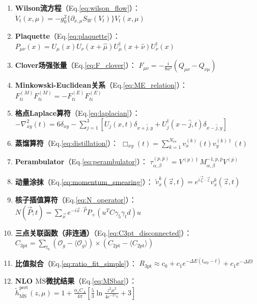 \documentclass[12pt,a4paper]{ctexart}
\theoremstyle{definition}
\newcommand{\MS}{\overline{\text{MS}}}
\newcommand{\hpert}{\tilde{h}^{\text{pert}}}
\newcommand{\tsep}{t_{\text{sep}}}
\newcommand{\alphas}{\alpha_s}
\newcommand{\CA}{C_A}
\begin{document}
\begin{enumerate}[label=(A\arabic*), leftmargin=*]
    \item \textbf{Wilson流方程}（Eq.\ref{eq:wilson_flow}）：
    $\dot{V}_t(x,\mu) = -g_0^2 \{\partial_{x,\mu} S_W(V_t)\} V_t(x,\mu)$

    \item \textbf{Plaquette}（Eq.\ref{eq:plaquette}）：
    $P_{\mu\nu}(x) = U_\mu(x) U_\nu(x+\hat{\mu}) U^\dagger_\mu(x+\hat{\nu}) U^\dagger_\nu(x)$

    \item \textbf{Clover场强张量}（Eq.\ref{eq:F_clover}）：
    $F_{\mu\nu} = -\frac{i}{8a^2} (Q_{\mu\nu} - Q_{\nu\mu})$

    \item \textbf{Minkowski-Euclidean关系}（Eq.\ref{eq:ME_relation}）：
    $F^{(M)}_{ti} F^{(M)}_{ti} = -F^{(E)}_{ti} F^{(E)}_{ti}$

    \item \textbf{格点Laplace算符}（Eq.\ref{eq:laplacian}）：
    $-\nabla^2_{xy}(t) = 6\delta_{xy} - \sum_{j=1}^{3} [U_j(x,t)\delta_{x+\hat{j},y} + U^\dagger_j(x-\hat{j},t)\delta_{x-\hat{j},y}]$

    \item \textbf{蒸馏算符}（Eq.\ref{eq:distillation}）：
    $\Box_{xy}(t) = \sum_{k=1}^{N_{\text{ev}}} v^{(k)}_x(t) v^{(k)\dagger}_y(t)$

    \item \textbf{Perambulator}（Eq.\ref{eq:perambulator}）：
    $\tau^{(p,\bar{p})}_{\alpha,\beta} = V^{(p)\dagger} M^{-1,p,\bar{p}}_{\alpha,\beta} V^{(\bar{p})}$

    \item \textbf{动量涂抹}（Eq.\ref{eq:momentum_smearing}）：
    $\tilde{v}^k_x(\vec{z},t) = e^{i\vec{\zeta}\cdot\vec{z}} v^k_x(\vec{z},t)$

    \item \textbf{核子插值算符}（Eq.\ref{eq:N_operator}）：
    $N(\vec{P}; t) = \sum_{\vec{x}} e^{-i\vec{x}\cdot\vec{P}} P_+ (u^T C \gamma_5 \gamma_t d) u$

    \item \textbf{三点关联函数（非连通）}（Eq.\ref{eq:C3pt_disconnected}）：
    $C_{3\text{pt}} = \sum_{t_0} (\mathcal{O}_g - \langle \mathcal{O}_g \rangle) \times (C_{2\text{pt}} - \langle C_{2\text{pt}} \rangle)$

    \item \textbf{比值拟合}（Eq.\ref{eq:ratio_fit_simple}）：
    $R_{3\text{pt}} \approx c_0 + c_1 e^{-\Delta E(\tsep - t)} + c_1 e^{-\Delta E t}$

    \item \textbf{NLO $\MS$微扰结果}（Eq.\ref{eq:MSbar}）：
    $\hpert_{\MS}(z, \mu) = 1 + \frac{\alphas \CA}{4\pi} [\frac{5}{3} \ln\frac{z^2\mu^2}{4e^{-2\gamma_E}} + 3]$


\end{enumerate}
\end{document}
